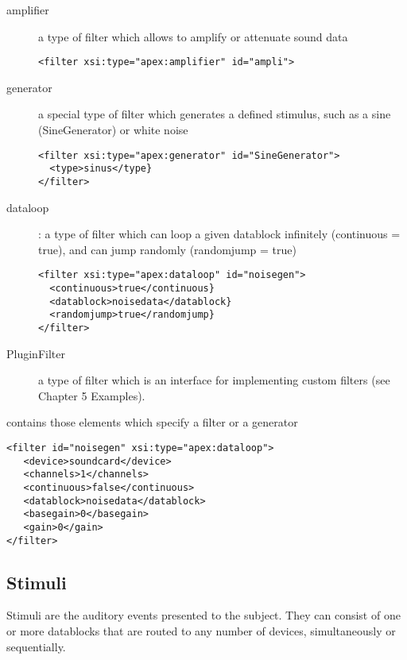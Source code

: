\begin{description}
\item[amplifier] a type of filter which allows to amplify or attenuate sound data

\begin{lstlisting} 
<filter xsi:type="apex:amplifier" id="ampli">
\end{lstlisting}

\item[generator] a special type of filter which generates a defined stimulus, such as a sine (SineGenerator) or white noise

\begin{lstlisting} 
<filter xsi:type="apex:generator" id="SineGenerator">
  <type>sinus</type}
</filter>
\end{lstlisting}

\item[dataloop]: a type of filter which can loop a given datablock infinitely (continuous = true), and can jump randomly (randomjump = true)

\begin{lstlisting} 
<filter xsi:type="apex:dataloop" id="noisegen">
  <continuous>true</continuous}
  <datablock>noisedata</datablock}
  <randomjump>true</randomjump}
</filter>
\end{lstlisting}

\item[PluginFilter] a type of filter which is an interface for implementing custom
filters (see Chapter 5 Examples).
\end{description}


 contains those elements which specify a filter or
a generator

\begin{lstlisting}
<filter id="noisegen" xsi:type="apex:dataloop">
   <device>soundcard</device>
   <channels>1</channels>
   <continuous>false</continuous> 
   <datablock>noisedata</datablock>
   <basegain>0</basegain>
   <gain>0</gain>
</filter>
\end{lstlisting}



\subsection{Stimuli}
\label{sec:Stimuli}

 Stimuli are the auditory events presented to the
subject. They can consist of one or more datablocks that are
routed to any number of devices, simultaneously or sequentially.

